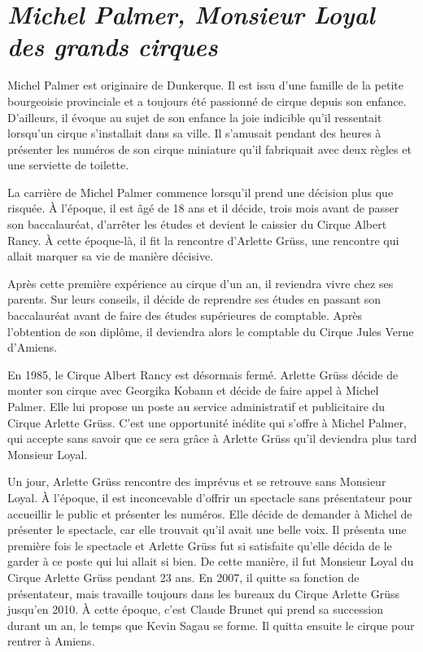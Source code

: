 \section*{\textit{Michel Palmer, Monsieur Loyal des grands cirques }}
{}

Michel Palmer est originaire de Dunkerque. Il est issu d’une famille de la petite bourgeoisie provinciale et a toujours été passionné de cirque depuis son enfance. D’ailleurs, il évoque au sujet de son enfance la joie indicible qu’il ressentait lorsqu’un cirque s’installait dans sa ville. Il s’amusait pendant des heures à présenter les numéros de son cirque miniature qu’il fabriquait avec deux règles et une serviette de toilette.

La carrière de Michel Palmer commence lorsqu’il prend une décision plus que risquée. À l’époque, il est âgé de 18 ans et il décide, trois mois avant de passer son baccalauréat, d’arrêter les études et devient le caissier du Cirque Albert Rancy. À cette époque-là, il fit la rencontre d’Arlette Grüss, une rencontre qui allait marquer sa vie de manière décisive.

Après cette première expérience au cirque d’un an, il reviendra vivre chez ses parents. Sur leurs conseils, il décide de reprendre ses études en passant son baccalauréat avant de faire des études supérieures de comptable. Après l’obtention de son diplôme, il deviendra alors le comptable du Cirque Jules Verne d’Amiens.

En 1985, le Cirque Albert Rancy est désormais fermé. Arlette Grüss décide de monter son cirque avec Georgika Kobann et décide de faire appel à Michel Palmer. Elle lui propose un poste au service administratif et publicitaire du Cirque Arlette Grüss. C’est une opportunité inédite qui s’offre à Michel Palmer, qui accepte sans savoir que ce sera grâce à Arlette Grüss qu’il deviendra plus tard Monsieur Loyal.

Un jour, Arlette Grüss rencontre des imprévus et se retrouve sans Monsieur Loyal. À l’époque, il est inconcevable d’offrir un spectacle sans présentateur pour accueillir le public et présenter les numéros. Elle décide de demander à Michel de présenter le spectacle, car elle trouvait qu’il avait une belle voix. Il présenta une première fois le spectacle et Arlette Grüss fut si satisfaite qu’elle décida de le garder à ce poste qui lui allait si bien. De cette manière, il fut Monsieur Loyal du Cirque Arlette Grüss pendant 23 ans. En 2007, il quitte sa fonction de présentateur, mais travaille toujours dans les bureaux du Cirque Arlette Grüss jusqu’en 2010. À cette époque, c’est Claude Brunet qui prend sa succession durant un an, le temps que Kevin Sagau se forme. Il quitta ensuite le cirque pour rentrer à Amiens.

